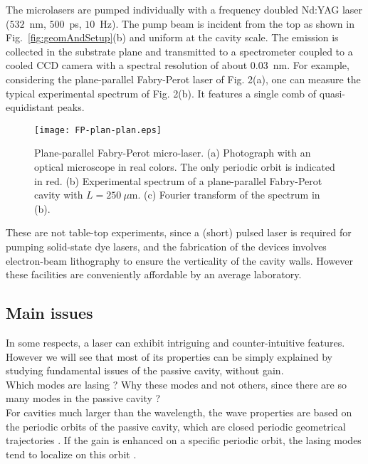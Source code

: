 \documentclass[10pt]{iopart}
\begin{document}
The microlasers are pumped individually with a frequency doubled Nd:YAG laser ($532$~nm, $500$~ps, $10$~Hz). The pump beam is incident from the top as shown in Fig.~\ref{fig:geomAndSetup}(b) and uniform at the cavity scale. The emission is collected in the substrate plane and transmitted to a spectrometer coupled to a cooled CCD camera with a spectral resolution of about $0.03$~nm. For example, considering the plane-parallel Fabry-Perot laser of Fig. 2(a), one can measure the typical experimental spectrum of Fig. 2(b). It features a single comb of quasi-equidistant peaks. \\

\begin{figure}[tb]
\begin{center}
\texttt{[image: FP-plan-plan.eps]}
\end{center}
\caption{Plane-parallel Fabry-Perot micro-laser. (a) Photograph with an optical microscope in real colors. The only periodic orbit is indicated in red. (b) Experimental spectrum of a plane-parallel Fabry-Perot cavity with $L=250~\mu$m. (c) Fourier transform of the spectrum in (b).}
\label{fig:plan-plan}
\end{figure}

These are not table-top experiments, since a (short) pulsed laser is required for pumping solid-state dye lasers, and the fabrication of the devices involves electron-beam lithography to ensure the verticality of the cavity walls. However these facilities are conveniently affordable by an average laboratory.


\subsection{Main issues}

In some respects, a laser can exhibit intriguing and counter-intuitive features. However we will see that most of its properties can be simply explained by studying fundamental issues of the passive cavity, without gain. \\

Which modes are lasing ? Why these modes and not others, since there are so many modes in the passive cavity ?\\
For cavities much larger than the wavelength, the wave properties are based on the periodic orbits of the passive cavity, which are closed periodic geometrical trajectories \cite{PRE-trace}. If the gain is enhanced on a specific periodic orbit, the lasing modes tend to localize on this orbit \cite{doya}.\\
\end{document}
